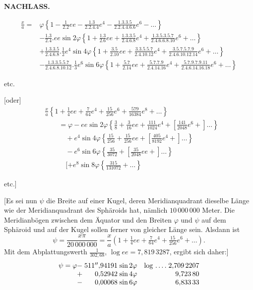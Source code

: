 \par\clearpage
{}\hfill{\small\textbf{NACHLASS.}}\hfill\null\par\medskip
\[
\begin{aligned}
\frac{x}{a}={}&\varphi\left\{1-\frac1{2.2}ee-\frac{1.3}{2.2.4.4}e^4-\frac{1.3.3.5}{2.2.4.4.6.6}e^6-\ldots\right\}\\
&-\frac{1.3}{2.4}.ee\sin2\varphi\left\{1+\frac{1.3}{2.6}ee+\frac{1.3.3.5}{2.4.6.8}e^4+\frac{1.3.5.3.5.7}{2.4.6.6.8.10}e^6+\ldots\right\}\\
&+\frac{1.3.3.5}{2.4.6.8}.\tfrac12e^4\sin4\varphi\left\{1+\frac{3.5}{2.10}ee+\frac{3.3.5.5.7}{2.4.10.12}e^4+\frac{3.5.7.5.7.9}{2.4.6.10.12.14}e^6+\ldots\right\}\\
&-\frac{1.3.3.5.5.7}{2.4.6.8.10.12}.\tfrac13e^6\sin6\varphi\left\{1+\frac{5.7}{2.14}ee+\frac{5.7.7.9}{2.4.14.16}e^4+\frac{5.7.9.7.9.11}{2.4.6.14.16.18}e^6+\ldots\right\}
\end{aligned}
\]
{\centering etc.\par}
[oder]
\[
\begin{aligned}
&\frac{x}{a}\left\{1+\tfrac14ee+\tfrac7{64}e^4+\tfrac{15}{256}e^6+\tfrac{579}{16384}e^8+\ldots\right\}\\
&\qquad=\varphi-ee\sin2\varphi\left\{\tfrac38+\tfrac3{16}ee+\tfrac{111}{1024}e^4+[\tfrac{141}{2048}e^6+]\ldots\right\}\\
&\qquad\quad+e^4\sin4\varphi\left\{\tfrac{15}{256}+\tfrac{15}{256}ee+[\tfrac{405}{8192}e^4+]\ldots\right\}\\
&\qquad\quad-e^6\sin6\varphi\left\{\tfrac{35}{3072}+[\tfrac{35}{2048}ee+]\ldots\right\}\\
&\qquad\quad[+e^8\sin8\varphi\left\{\tfrac{315}{131072}+\ldots\right\}
\end{aligned}
\]
{\centering etc.]\par}
[Es sei nun \(\psi\) die Breite auf einer Kugel, deren Meridianquadrant dieselbe Länge wie der Meridianquadrant des Sphäroids hat, nämlich \(10\,000\,000\) Meter. Die Meridianbögen zwischen dem Äquator und den Breiten \(\varphi\) und \(\psi\) auf dem Sphäroid und auf der Kugel sollen ferner von gleicher Länge sein. Alsdann ist
\[
\psi=\frac{x\pi}{20\,000\,000}=\frac{x}{a}\left(1+\tfrac14ee+\tfrac7{64}e^4+\tfrac{15}{256}e^6+\ldots\right).
\]
Mit dem Abplattungswerth \(\frac1{302{,}68}\), \(\log ee=7{,}819\,3287\), ergibt sich daher:]
\[
\begin{array}{@{}r@{\;}r@{\;}l@{\quad}l@{\;}r@{}}
\psi=\varphi-&511''{,}94191&\sin2\varphi&\log\,.\,.\,.\,.&2{,}709\,2207\\
+&0{,}52942&\sin4\varphi&&9{,}723\,80\\
-&0{,}00068&\sin6\varphi&&6{,}833\,33
\end{array}
\]
